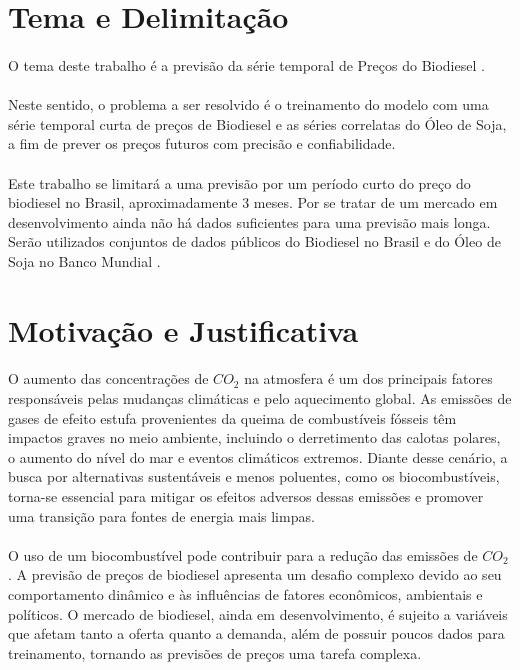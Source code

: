 \section{Tema e Delimitação}

\paragraph{} O tema deste trabalho é a previsão da série temporal de Preços do Biodiesel \cite{biodiesel24}.
\paragraph{} Neste sentido, o problema a ser resolvido é o treinamento do modelo com uma série temporal curta de preços de Biodiesel e as séries correlatas do Óleo de Soja, a fim de prever os preços futuros com precisão e confiabilidade.
\paragraph{} Este trabalho se limitará a uma previsão por um período curto do preço do biodiesel no Brasil, aproximadamente 3 meses. Por se tratar de um mercado em desenvolvimento ainda não há dados suficientes para uma previsão mais longa. Serão utilizados conjuntos de dados públicos do Biodiesel no Brasil \cite{biodiesel24} e do Óleo de Soja no Banco Mundial \cite{worldbank2024}.


\section{Motivação e Justificativa}

\paragraph{} O aumento das concentrações de \(CO_2\) na atmosfera é um dos principais fatores responsáveis pelas mudanças climáticas e pelo aquecimento global. As emissões de gases de efeito estufa provenientes da queima de combustíveis fósseis têm impactos graves no meio ambiente, incluindo o derretimento das calotas polares, o aumento do nível do mar e eventos climáticos extremos. Diante desse cenário, a busca por alternativas sustentáveis e menos poluentes, como os biocombustíveis, torna-se essencial para mitigar os efeitos adversos dessas emissões e promover uma transição para fontes de energia mais limpas.
\paragraph{} O uso de um biocombustível pode contribuir para a redução das emissões de \(CO_2\). A previsão de preços de biodiesel apresenta um desafio complexo devido ao seu comportamento dinâmico e às influências de fatores econômicos, ambientais e políticos. O mercado de biodiesel, ainda em desenvolvimento, é sujeito a variáveis que afetam tanto a oferta quanto a demanda, além de possuir poucos dados para treinamento, tornando as previsões de preços uma tarefa complexa.

